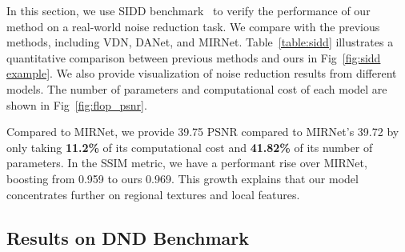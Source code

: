 \documentclass[final]{cvpr}
\begin{document}
In this section, we use SIDD benchmark~\cite{abdelhamed2018high} to verify the performance of our method on a real-world noise reduction task. We compare with the previous methods, including VDN, DANet, and MIRNet. Table~\ref{table:sidd} illustrates a quantitative comparison between previous methods and ours in Fig~\ref{fig:sidd example}. We also provide visualization of noise reduction results from different models. The number of parameters and computational cost of each model are shown in Fig~\ref{fig:flop_psnr}. 

Compared to MIRNet, we provide 39.75 PSNR compared to MIRNet's 39.72 by only taking \textbf{11.2\%} of its computational cost and \textbf{41.82\%} of its number of parameters. In the SSIM metric, we have a performant rise over MIRNet, boosting from 0.959 to ours 0.969. This growth explains that our model concentrates further on regional textures and local features. 


\begin{figure*}[h]
  \centering 
    \vspace{-1mm}
    \caption{\small Results of Gaussian noise reduction. Our method obtains better visual results in the flower area.}
    \label{fig:sidd example}
\end{figure*}
  
\subsection{Results on DND Benchmark}
\end{document}
